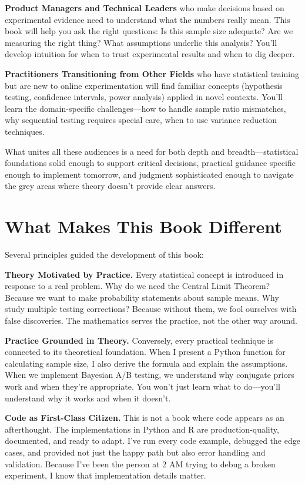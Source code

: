 \textbf{Product Managers and Technical Leaders} who make decisions based on experimental evidence need to understand what the numbers really mean. This book will help you ask the right questions: Is this sample size adequate? Are we measuring the right thing? What assumptions underlie this analysis? You'll develop intuition for when to trust experimental results and when to dig deeper.

\textbf{Practitioners Transitioning from Other Fields} who have statistical training but are new to online experimentation will find familiar concepts (hypothesis testing, confidence intervals, power analysis) applied in novel contexts. You'll learn the domain-specific challenges—how to handle sample ratio mismatches, why sequential testing requires special care, when to use variance reduction techniques.

What unites all these audiences is a need for both depth and breadth—statistical foundations solid enough to support critical decisions, practical guidance specific enough to implement tomorrow, and judgment sophisticated enough to navigate the grey areas where theory doesn't provide clear answers.

\section*{What Makes This Book Different}

Several principles guided the development of this book:

\textbf{Theory Motivated by Practice.} Every statistical concept is introduced in response to a real problem. Why do we need the Central Limit Theorem? Because we want to make probability statements about sample means. Why study multiple testing corrections? Because without them, we fool ourselves with false discoveries. The mathematics serves the practice, not the other way around.

\textbf{Practice Grounded in Theory.} Conversely, every practical technique is connected to its theoretical foundation. When I present a Python function for calculating sample size, I also derive the formula and explain the assumptions. When we implement Bayesian A/B testing, we understand why conjugate priors work and when they're appropriate. You won't just learn what to do—you'll understand why it works and when it doesn't.

\textbf{Code as First-Class Citizen.} This is not a book where code appears as an afterthought. The implementations in Python and R are production-quality, documented, and ready to adapt. I've run every code example, debugged the edge cases, and provided not just the happy path but also error handling and validation. Because I've been the person at 2 AM trying to debug a broken experiment, I know that implementation details matter.

